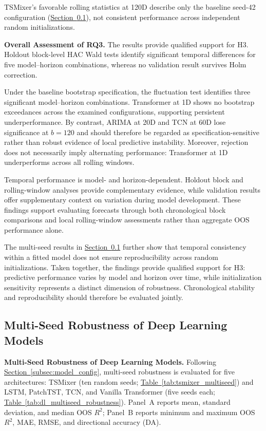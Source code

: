\documentclass[runningheads,orivec]{llncs}
\begin{document}
TSMixer's favorable rolling statistics at 120D describe only the baseline seed-42 configuration (\hyperref[subsec:multiseed_robustness]{Section~\ref*{subsec:multiseed_robustness}}), not consistent performance across independent random initializations.

\medskip
\noindent\textbf{Overall Assessment of RQ3.}
The results provide qualified support for H3. Holdout block-level HAC Wald tests identify significant temporal differences for five model--horizon combinations, whereas no validation result survives Holm correction.

Under the baseline bootstrap specification, the fluctuation test identifies three significant model--horizon combinations. Transformer at 1D shows no bootstrap exceedances across the examined configurations, supporting persistent underperformance. By contrast, ARIMA at 20D and TCN at 60D lose significance at $b=120$ and should therefore be regarded as specification-sensitive rather than robust evidence of local predictive instability. Moreover, rejection does not necessarily imply alternating performance: Transformer at 1D underperforms across all rolling windows.

Temporal performance is model- and horizon-dependent. Holdout block and rolling-window analyses provide complementary evidence, while validation results offer supplementary context on variation during model development. These findings support evaluating forecasts through both chronological block comparisons and local rolling-window assessments rather than aggregate OOS performance alone.

The multi-seed results in \hyperref[subsec:multiseed_robustness]{Section~\ref*{subsec:multiseed_robustness}} further show that temporal consistency within a fitted model does not ensure reproducibility across random initializations. Taken together, the findings provide qualified support for H3: predictive performance varies by model and horizon over time, while initialization sensitivity represents a distinct dimension of robustness. Chronological stability and reproducibility should therefore be evaluated jointly.


\subsection{Multi-Seed Robustness of Deep Learning Models}\label{subsec:multiseed_robustness}

\noindent\textbf{Multi-Seed Robustness of Deep Learning Models.}
Following \hyperref[subsec:model_config]{Section~\ref*{subsec:model_config}}, multi-seed robustness is evaluated for five architectures: TSMixer (ten random seeds; \hyperref[tab:tsmixer_multiseed]{Table~\ref*{tab:tsmixer_multiseed}}) and LSTM, PatchTST, TCN, and Vanilla Transformer (five seeds each; \hyperref[tab:dl_multiseed_robustness]{Table~\ref*{tab:dl_multiseed_robustness}}). Panel~A reports mean, standard deviation, and median OOS $R^2$; Panel~B reports minimum and maximum OOS $R^2$, MAE, RMSE, and directional accuracy (DA).
\end{document}
